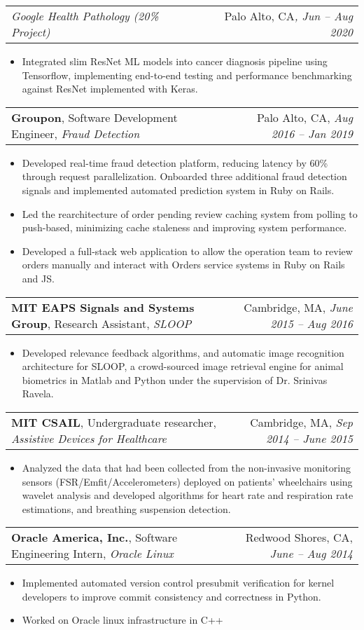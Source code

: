 \documentclass[letterpaper,11pt]{article}
\makeatletter
\newcommand{\resumeItem}[1]{
  \item\small{
    {#1 \vspace{-3pt}}
  }
}
\newcommand{\resumeSubheading}[5]{
  \vspace{-1pt}\item
    \begin{tabular*}{0.97\textwidth}[t]{l@{\extracolsep{\fill}}r}
      \textbf{#1}{\small, #2, \textit{#3}} &  {\small#4}{, \textit{\small #5}} \\
    \end{tabular*}
    \vspace{-9pt}
}
\newcommand{\resumeSubSubheadingMultiteam}[4]{
    \begin{tabular*}{0.97\textwidth}{l@{\extracolsep{\fill}}r}
      \textit{\small#1}{ \scriptsize #4} & {\small#2}\textit{\small, #3} \\
    \end{tabular*}
    \vspace{-8pt}
}
\newcommand{\resumeItemListStart}{\begin{itemize}}
\newcommand{\resumeItemListEnd}{\end{itemize}\vspace{-5pt}}
\makeatother
\begin{document}
  \resumeSubSubheadingMultiteam
   {Google Health Pathology (20\% Project)}{Palo Alto, CA}{Jun -- Aug 2020}{}
      \resumeItemListStart
\resumeItem{Integrated slim ResNet ML models into cancer diagnosis pipeline using Tensorflow, implementing end-to-end testing and performance benchmarking against ResNet implemented with Keras.}
      \resumeItemListEnd

    \resumeSubheading
      {Groupon}{Software Development Engineer}{Fraud Detection}
      {Palo Alto, CA}{Aug 2016 -- Jan 2019}
      
      \resumeItemListStart
        \resumeItem{Developed real-time fraud detection platform, reducing latency by 60\% through request parallelization. Onboarded three additional fraud detection signals and implemented automated prediction system in Ruby on Rails.}
        \resumeItem{
        Led the rearchitecture of order pending review caching system from polling to push-based, minimizing cache staleness and improving system performance.}
        \resumeItem{Developed a full-stack web application to allow the operation team to review orders manually and interact with Orders service systems in Ruby on Rails and JS.}
      \resumeItemListEnd

    \resumeSubheading
      {MIT EAPS Signals and Systems Group}{Research Assistant}{SLOOP}
      {Cambridge, MA}{June 2015 -- Aug 2016}
      \resumeItemListStart
        \resumeItem{Developed relevance feedback algorithms, and automatic image recognition architecture for SLOOP, a crowd-sourced image retrieval engine for animal biometrics in Matlab and Python under the supervision of Dr. Srinivas Ravela.}
      \resumeItemListEnd

    \resumeSubheading
      {MIT CSAIL}{Undergraduate researcher}{Assistive Devices for Healthcare}
      {Cambridge, MA}{Sep 2014 -- June 2015}
      \resumeItemListStart
        \resumeItem{Analyzed the data that had been collected from the non-invasive monitoring sensors (FSR/Emfit/Accelerometers) deployed on patients’ wheelchairs using wavelet analysis and developed algorithms for heart rate and respiration rate estimations, and breathing suspension detection.}
      \resumeItemListEnd

    \resumeSubheading
      {Oracle America, Inc.}{Software Engineering Intern}{Oracle Linux}
      {Redwood Shores, CA}{June -- Aug 2014}
      \resumeItemListStart
        \resumeItem{Implemented automated version control presubmit verification for kernel developers to improve commit consistency and correctness in Python.}
        \resumeItem{Worked on Oracle linux infrastructure in C++}
      \resumeItemListEnd
\end{document}

